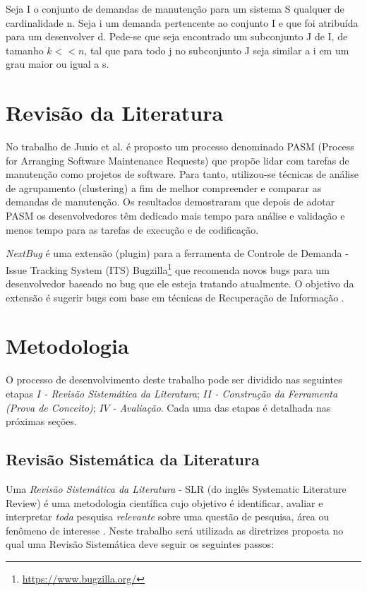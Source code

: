 \documentclass[msc,proposal,hidelot,hideabstract]{ppgccufmg} %
\begin{document}
Seja I o conjunto de demandas de manutenção para um sistema S qualquer de
cardinalidade n. Seja i
um demanda pertencente ao conjunto I e que foi atribuída para um desenvolver
d. Pede-se que seja encontrado um subconjunto J de I, de tamanho $k << n$, tal
que para todo j no subconjunto J seja similar a i em um grau maior ou igual a s.


\chapter{Revisão da Literatura}
\label{ch:revisao}

No trabalho de Junio et al. \cite{5741246} é proposto um processo denominado PASM (Process for Arranging
Software Maintenance Requests) que propõe lidar com tarefas de manutenção como
projetos de software. Para tanto, utilizou-se técnicas de análise de
agrupamento (clustering) a fim de melhor compreender e comparar as demandas de
manutenção. Os resultados demostraram que depois de adotar PASM os
desenvolvedores têm dedicado mais tempo para análise e validação e menos tempo
para as tarefas de execução e de codificação.

\textit{NextBug} \cite{101186} é uma extensão (plugin) para a ferramenta de Controle de Demanda -
Issue Tracking System (ITS) Bugzilla\footnote{\url{https://www.bugzilla.org/}}
que recomenda novos bugs para um desenvolvedor baseado no bug que ele esteja
tratando atualmente. O objetivo da extensão é sugerir bugs com base em técnicas de
Recuperação de Informação \cite{baeza1999modern}.


\chapter{Metodologia}
\label{ch:metodologia}

O processo de desenvolvimento deste trabalho pode ser dividido nas seguintes
etapas $I$\textit{ - Revisão Sistemática da Literatura}; $II$\textit{ - Construção da Ferramenta
  (Prova de Conceito)}; $IV$\textit{ - Avaliação}. Cada uma das etapas é detalhada nas próximas seções.

\section{Revisão Sistemática da Literatura}
\label{sec:revisao_sistematica}

Uma \textit{Revisão Sistemática da Literatura} - SLR (do inglês Systematic Literature Review) é uma
metodologia científica cujo objetivo é identificar, avaliar e interpretar
\textit{toda} pesquisa \textit{relevante} sobre uma questão de pesquisa, área
ou fenômeno de interesse \cite{keele2007guidelines,wohlin2012experimentation}. Neste trabalho
será utilizada as diretrizes proposta \cite{keele2007guidelines} no qual uma
Revisão Sistemática deve seguir os seguintes passos:
\end{document}
